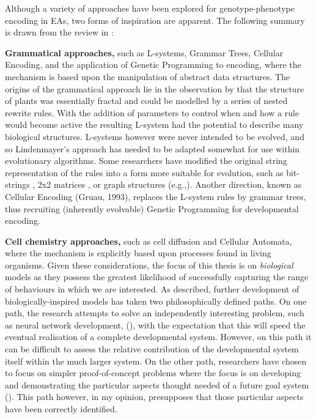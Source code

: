 Although a variety of approaches have been explored for genotype-phenotype encoding in EAs, two forms of inspiration are apparent. The following summary is drawn from the review in \textcite{Stanley:2003fh}:

\textbf{Grammatical approaches,} such as L-systems, Grammar Trees, Cellular Encoding, and the application of Genetic Programming to encoding, where the mechanism is based upon the manipulation of abstract data structures. The origins of the grammatical approach lie in the observation by \textcite{Lindenmayer:1968nl} that the structure of plants was essentially fractal and could be modelled by a series of nested rewrite rules. With the addition of parameters to control when and how a rule would become active the resulting L-system had the potential to describe many biological structures. L-systems however were never intended to be evolved, and so Lindenmayer's approach has needed to be adapted somewhat for use within evolutionary algorithms. Some researchers have modified the original string representation of the rules into a form more suitable for evolution, such as bit-strings \parencite{Boers:1992cn}, 2x2 matrices \parencite{Kitano:1990fs}, or graph structures (e.g.,\cite{Sims:1994uq}). Another direction, known as Cellular Encoding (Gruau, 1993), replaces the L-system rules by grammar trees, thus recruiting (inherently evolvable) Genetic Programming for developmental encoding.

\textbf{Cell chemistry approaches,} such as cell diffusion and Cellular Automata, where the mechanism is explicitly based upon processes found in living organisms. Given these considerations, the focus of this thesis is on \emph{biological} models as they possess the greatest likelihood of successfully capturing the range of behaviours in which we are interested. As \textcite{Stanley:2003fh} described, further development of biologically-inspired models has taken two philosophically defined paths. On one path, the research attempts to solve an independently interesting problem, such as neural network development, (\eg \cite{Bongard:2003tf}), with the expectation that this will speed the eventual realisation of a complete developmental system. However, on this path it can be difficult to assess the relative contribution of the developmental system itself within the much larger system. On the other path, researchers have chosen to focus on simpler proof-of-concept problems where the focus is on developing and demonstrating the particular aspects thought needed of a future goal system (\eg \cite{Bentley:1999zr,Roggen:2007kl}). This path however, in my opinion, presupposes that those particular aspects have been correctly identified.

